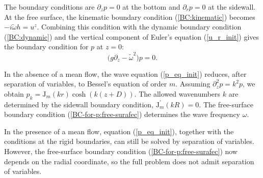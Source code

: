 \documentclass[aps,twocolumn]{revtex4-2}
\begin{document}
The boundary conditions are $\partial_z p =0$ at the bottom and $\partial_rp=0$ at the sidewall. At the free surface, the kinematic boundary condition (\ref{BC:kinematic}) becomes $-i\widetilde\omega h = u^z $. Combining this condition with the dynamic boundary condition (\ref{BC:dynamic}) and the vertical component of Euler's equation (\ref{u_r_init}) gives the boundary condition for $p$ at $z=0$:
\begin{equation}\label{BC-for-p:free-surafec}
	\big( g \partial_z - \widetilde\omega^2\big) p
	=
	0.
\end{equation}

In the absence of a mean flow, the wave equation (\ref{p_eq_init}) reduces, after separation of variables, to Bessel's equation of order $m$. Assuming $\partial_z^2 p = k^2 p$, we obtain $p_k = {\mathrm J}_m(kr)\cosh(k(z+D))$. The allowed wavenumbers $k$ are determined by the sidewall boundary condition, ${\mathrm J}^\prime_m(kR) = 0$. The free-surface boundary condition (\ref{BC-for-p:free-surafec}) determines the wave frequency $\omega$.

In the presence of a mean flow, equation (\ref{p_eq_init}), together with the conditions at the rigid boundaries, can still be solved by separation of variables. However, the free-surface boundary condition (\ref{BC-for-p:free-surafec}) now depends on the radial coordinate, so the full problem does not admit separation of variables.
\end{document}
